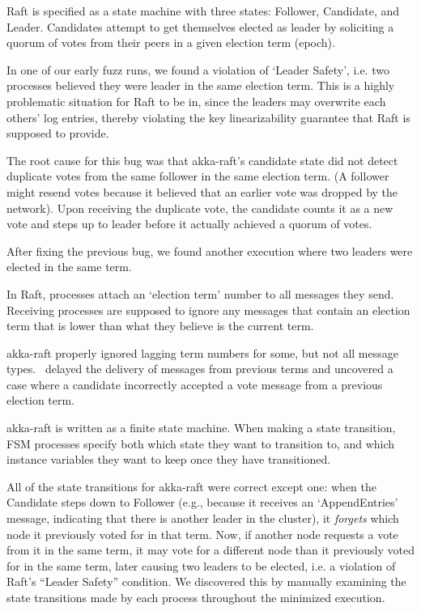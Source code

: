  Raft is specified as a state machine with three
 states: Follower, Candidate, and Leader. Candidates attempt to
 get themselves elected as leader by soliciting a quorum of
 votes from their peers in a given election term (epoch).

In one of our early fuzz runs, we found a violation of `Leader Safety',
 i.e. two processes believed they were leader in the same election term.
 This is a highly problematic situation for Raft to be in, since the leaders may overwrite each
 others' log entries, thereby violating the key linearizability guarantee that
 Raft is supposed to provide.

The root cause for this bug was that akka-raft's candidate
 state did not detect duplicate votes from the same follower
 in the same election term. (A follower might resend votes because it
 believed that an earlier vote was dropped by the network).
 Upon receiving the duplicate vote, the candidate counts it as a new vote and steps
 up to leader before it actually achieved a quorum of votes.

 After fixing the previous bug, we found another
 execution where two leaders were elected in the same term.

In Raft, processes attach an `election term' number to all messages they send.
 Receiving processes are supposed to ignore any messages that contain an election
 term that is lower than what they believe is the current term.

akka-raft properly ignored lagging term numbers for some, but not all
 message types. \sys~delayed the delivery of messages from previous terms and
 uncovered a case where a candidate incorrectly accepted a vote message from a previous election term.

 akka-raft is written as a finite state machine.
When making a state transition, FSM processes specify both which state they want to transition to, and which instance variables they want to keep once they have transitioned.

All of the state transitions for akka-raft were correct except
one: when the Candidate
steps down to Follower (e.g., because it receives an `AppendEntries' message,
indicating that there is another leader in the cluster), it
{\em forgets} which node it previously voted for in that term. Now, if another
node requests a vote from it in the same term, it may vote for
a different node than it previously voted for in the same term, later causing
two leaders to be elected, i.e. a violation of Raft's ``Leader Safety''
condition. We discovered this by manually examining the state
transitions made by each process throughout the minimized execution.

